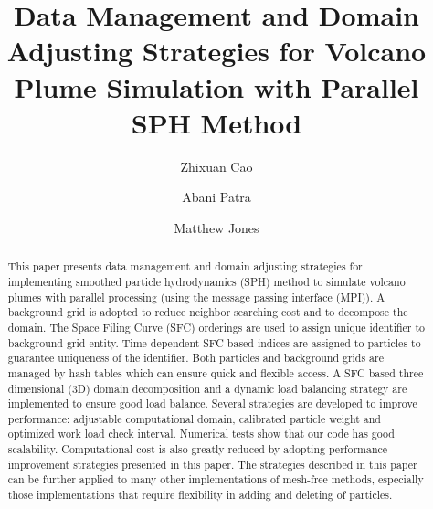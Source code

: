 \documentclass[procedia]{easychair}
\title{Data Management and Domain Adjusting Strategies for Volcano Plume Simulation with Parallel SPH Method}
\author{
    Zhixuan Cao\inst{1}%
\and
    Abani Patra\inst{1}
\and
    Matthew Jones\inst{2}%
}
\institute{
Department of MAE,
University at Buffalo, Buffalo, New York, U.S.A.\\
\and
Center for Computational Research,
University at Buffalo, Buffalo, New York, U.S.A.\\
 }
\begin{document}
\maketitle


\begin{abstract}
This paper presents data management and domain adjusting strategies for implementing smoothed particle hydrodynamics (SPH) method to simulate volcano plumes with parallel processing (using the message passing interface (MPI)). 
A background grid is adopted to reduce neighbor searching cost and to decompose the domain. The Space Filing Curve (SFC) orderings are used to assign unique identifier to background grid entity. Time-dependent SFC based indices are assigned to particles to guarantee uniqueness of the identifier.  
Both particles and background grids are managed by hash tables which can ensure quick and flexible access.
A SFC based three dimensional (3D) domain decomposition and a dynamic load balancing strategy are implemented to ensure good load balance. 
Several strategies are developed to improve performance: adjustable computational domain, calibrated particle weight and optimized work load check interval. 
Numerical tests show that our code has good scalability. Computational cost is also greatly reduced by adopting performance improvement strategies presented in this paper. 
The strategies described in this paper can be further applied to many other implementations of mesh-free methods, especially those implementations that require flexibility in adding and deleting of particles.
\end{abstract}


%
%


\end{document}
